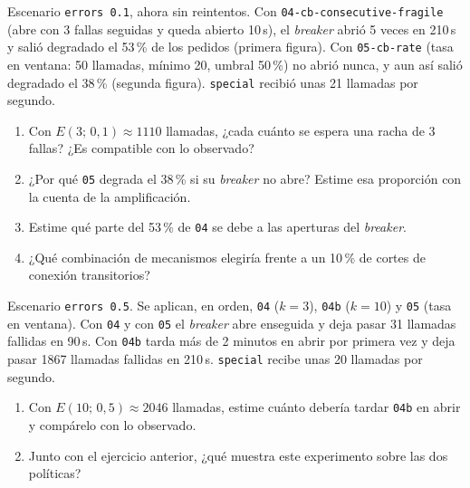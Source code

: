 \documentclass[variant=guia,cover=institutional,mode=screen]{ua-engineering-v6-article}
\begin{document}
\begin{uaexercise}
Escenario \texttt{errors 0.1}, ahora sin reintentos. Con \texttt{04-cb-consecutive-fragile} (abre con 3 fallas seguidas y queda abierto 10\,s), el \emph{breaker} abrió 5 veces en 210\,s y salió degradado el 53\,\% de los pedidos (primera figura). Con \texttt{05-cb-rate} (tasa en ventana: 50 llamadas, mínimo 20, umbral 50\,\%) no abrió nunca, y aun así salió degradado el 38\,\% (segunda figura). \texttt{special} recibió unas 21 llamadas por segundo.
\begin{enumerate}
\item Con $E(3;\,0{,}1) \approx 1110$ llamadas, ¿cada cuánto se espera una racha de 3 fallas? ¿Es compatible con lo observado?
\item ¿Por qué \texttt{05} degrada el 38\,\% si su \emph{breaker} no abre? Estime esa proporción con la cuenta de la amplificación.
\item Estime qué parte del 53\,\% de \texttt{04} se debe a las aperturas del \emph{breaker}.
\item ¿Qué combinación de mecanismos elegiría frente a un 10\,\% de cortes de conexión transitorios?
\end{enumerate}
\end{uaexercise}

\begin{uaexercise}
Escenario \texttt{errors 0.5}. Se aplican, en orden, \texttt{04} ($k = 3$), \texttt{04b} ($k = 10$) y \texttt{05} (tasa en ventana). Con \texttt{04} y con \texttt{05} el \emph{breaker} abre enseguida y deja pasar 31 llamadas fallidas en 90\,s. Con \texttt{04b} tarda más de 2 minutos en abrir por primera vez y deja pasar 1867 llamadas fallidas en 210\,s. \texttt{special} recibe unas 20 llamadas por segundo.
\begin{enumerate}
\item Con $E(10;\,0{,}5) \approx 2046$ llamadas, estime cuánto debería tardar \texttt{04b} en abrir y compárelo con lo observado.
\item Junto con el ejercicio anterior, ¿qué muestra este experimento sobre las dos políticas?
\end{enumerate}
\end{uaexercise}
\end{document}
